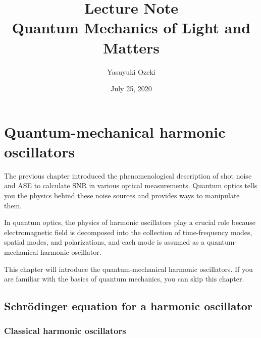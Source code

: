 \documentclass{book}
\begin{document}
\title{Lecture Note \\ Quantum Mechanics of Light and Matters}
\author{Yasuyuki Ozeki}
\date{July 25, 2020}

\maketitle
\tableofcontents
\mainmatter





\chapter{Quantum-mechanical harmonic oscillators}
The previous chapter introduced the phenomenological description of shot noise and ASE to calculate SNR in various optical measurements. Quantum optics tells you the physics behind these noise sources and provides ways to manipulate them.

In quantum optics, the physics of harmonic oscillators play a crucial role because electromagnetic field is decomposed into the collection of time-frequency modes, spatial modes, and polarizations, and each mode is assumed as a quantum-mechanical harmonic oscillator. 

This chapter will introduce the quantum-mechanical harmonic oscillators. If you are familiar with the basics of quantum mechanics, you can skip this chapter.

\section{Schr\"odinger equation for a harmonic oscillator}
\subsection{Classical harmonic oscillators}
\end{document}
